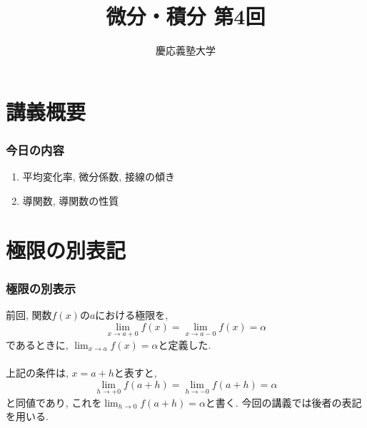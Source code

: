 \documentclass[dvipdfmx,cjk,10.2pt]{beamer}
\theoremstyle{definition}
\begin{document}
\title{微分・積分 第4回} 
\author{慶応義塾大学}            %
\date{}



\begin{frame}                  %
\titlepage                     %
\end{frame}








\section{講義概要}


\begin{frame}
\frametitle{今日の内容}



\begin{enumerate}
\item 平均変化率, 微分係数, 接線の傾き
\item 導関数, 導関数の性質
\end{enumerate} 



\end{frame}






\section{極限の別表記}


\begin{frame}
\frametitle{極限の別表示}


前回, 関数$f(x)$の$a$における極限を,
$$
\lim_{x \to a +0}f(x)=\lim_{x \to a -0}f(x)=\alpha
$$
であるときに, $\displaystyle \lim_{x \to a}f(x)=\alpha$と定義した. \\
\ \\

上記の条件は, $x=a+h$と表すと, 
$$
\lim_{h \to +0}f(a+h)=\lim_{h\to -0}f(a+h)=\alpha
$$
と同値であり, これを$\displaystyle \lim_{h \to 0}f(a+h)=\alpha$と書く. 
今回の講義では後者の表記を用いる. 


\end{frame}
\end{document}
